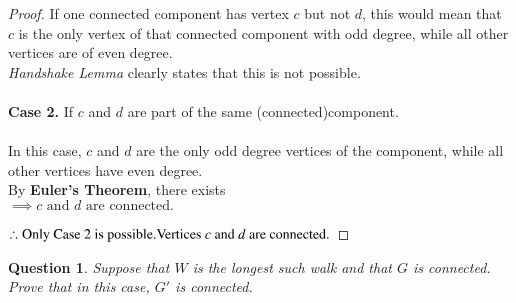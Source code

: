 \documentclass{article}
\newtheorem{question}{Question}
\begin{document}
\begin{proof}
        
        If one connected component has vertex $c$ but not $d$, this would mean that $c$ is the only vertex of that connected component with odd degree, while all other vertices are of even degree.\\
        \textit{Handshake Lemma} clearly states that this is not possible.\\
        \\
    \textbf{Case 2.}
        If $c$ and $d$ are part of the same (connected)component.\\
        \\
        In this case, $c$ and $d$ are the only odd degree vertices of the component, while all other vertices have even degree.\\
        By \textbf{Euler's Theorem}, there exists 
        \\
        $\implies \text{$c$ and $d$ are connected.}$
    

    $\therefore \text{Only Case 2 is possible.\\ Vertices $c$ and $d$ are connected.}$
\end{proof}
\pagebreak
\begin{question}
    Suppose that $W$ is the longest such walk and that $G$ is connected.  Prove that in this case, $G'$ is connected.
\end{question}
\end{document}
